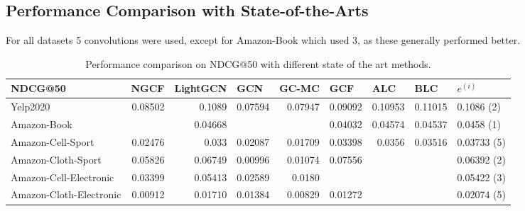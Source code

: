 \subsection{Performance Comparison with State-of-the-Arts}
For all datasets 5 convolutions were used, except for Amazon-Book which used 3, as these generally performed better.


\begin{table*}[] %
    \centering  %
    \begin{tabular}{|l|r|r|r|r|r||r|r|l|}
        \hline
        NDCG@50                 & \multicolumn{1}{l|}{NGCF} & \multicolumn{1}{l|}{LightGCN} & \multicolumn{1}{l|}{GCN} & \multicolumn{1}{l|}{GC-MC} & \multicolumn{1}{l||}{GCF} & \multicolumn{1}{l|}{ALC} & \multicolumn{1}{l|}{BLC} & $e^{(i)}$   \\ \hline
        Yelp2020                & 0.08502                   & 0.1089                        & 0.07594                  & 0.07947                    & 0.09092                   & 0.10953                  & 0.11015                  & 0.1086 (2)  \\ \hline
        Amazon-Book             &                           & 0.04668                       &                          &                            & 0.04032                   & 0.04574                  & 0.04537                  & 0.0458 (1)  \\ \hline
        Amazon-Cell-Sport       & 0.02476                   & 0.033                         & 0.02087                  & 0.01709                    & 0.03398                   & 0.0356                   & 0.03516                  & 0.03733 (5) \\ \hline
        Amazon-Cloth-Sport      & 0.05826                   & 0.06749                       & 0.00996                  & 0.01074                    & 0.07556                   &                          &                          & 0.06392 (2) \\ \hline
        Amazon-Cell-Electronic  & 0.03399                   & 0.05413                       & 0.02589                  & 0.0180                    &                           &                          &                          & 0.05422 (3) \\ \hline
        Amazon-Cloth-Electronic & 0.00912                   & 0.01710                       & 0.01384                  & 0.00829                    & 0.01272                   &                          &                          & 0.02074 (5) \\ \hline
    \end{tabular}
    \caption{Performance comparison on NDCG@50 with different state of the art methods.}
    \label{tab:baselines-ndcg}
\end{table*}


